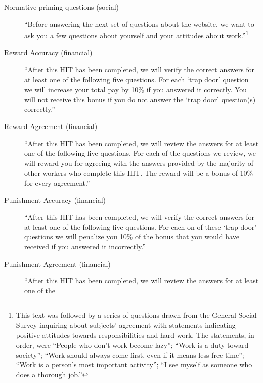 \documentclass{chi2009}
\begin{document}
\begin{description}
\item[Normative priming questions (social)] ``Before answering the next
  set of questions about the website, we want to ask you a few
  questions about yourself and your attitudes about
  work.''\footnote{This text was followed by a series of questions drawn from the General Social Survey inquiring about subjects' agreement with statements indicating positive attitudes towards responsibilities and hard work. The statements, in order, were ``People who don't work become lazy''; ``Work is a duty toward society''; ``Work should always come first, even if it means less free time''; ``Work is a person's most important activity''; ``I see myself as someone who does a thorough job.''} %
\item[Reward Accuracy (financial)] ``After this HIT has been completed,
  we will verify the correct answers for at least one of the following
  five questions. For each `trap door' question we will increase your
  total pay by 10\% if you answered it correctly. You will not receive
  this bonus if you do not answer the `trap door' question(s)
  correctly.'' %
\item[Reward Agreement (financial)] ``After this HIT has been
  completed, we will review the answers for at least one of the
  following five questions. For each of the questions we review, we
  will reward you for agreeing with the answers provided by the
  majority of other workers who complete this HIT. The reward will be
  a bonus of 10\% for every agreement.'' %
\item[Punishment Accuracy (financial)] ``After this HIT has been
  completed, we will verify the correct answers for at least one of
  the following five questions. For each on of these `trap door'
  questions we will penalize you 10\% of the bonus that you would have
  received if you answered it incorrectly.'' %
\item[Punishment Agreement (financial)] ``After this HIT has been
  completed, we will review the answers for at least one of the

\end{description}
\end{document}
